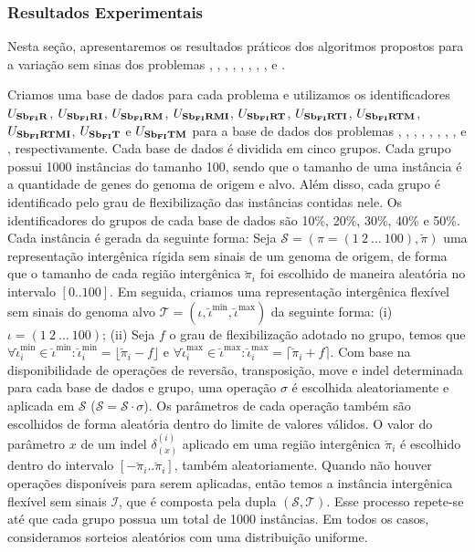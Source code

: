 \subsubsection{Resultados Experimentais}\label{subsubsection:PWLZZAVH}

Nesta seção, apresentaremos os resultados práticos dos algoritmos propostos para a variação sem sinas dos problemas \SbFIR{}, \SbFIRI{}, \SbFIRM{}, \SbFIRMI{}, \SbFIRT{}, \SbFIRTI{}, \SbFIRTM{}, \SbFIRTMI{}, \SbFIT{} e \SbFITM{}.

Criamos uma base de dados para cada problema e utilizamos os identificadores $U_{\textbf{Sb\textsubscript{FI}R}}{}$, $U_{\textbf{Sb\textsubscript{FI}RI}}{}$, $U_{\textbf{Sb\textsubscript{FI}RM}}{}$, $U_{\textbf{Sb\textsubscript{FI}RMI}}{}$, $U_{\textbf{Sb\textsubscript{FI}RT}}{}$, $U_{\textbf{Sb\textsubscript{FI}RTI}}{}$, $U_{\textbf{Sb\textsubscript{FI}RTM}}{}$, $U_{\textbf{Sb\textsubscript{FI}RTMI}}{}$, $U_{\textbf{Sb\textsubscript{FI}T}}{}$ e \break$U_{\textbf{Sb\textsubscript{FI}TM}}{}$ para a base de dados dos problemas \SbFIR{}, \SbFIRI{}, \SbFIRM{}, \SbFIRMI{}, \SbFIRT{}, \SbFIRTI{}, \SbFIRTM{}, \SbFIRTMI{}, \SbFIT{} e \SbFITM{}, respectivamente. Cada base de dados é dividida em cinco grupos. Cada grupo possui 1000 instâncias do tamanho 100, sendo que o tamanho de uma instância é a quantidade de genes do genoma de origem e alvo. Além disso, cada grupo é identificado pelo grau de flexibilização das instâncias contidas nele. Os identificadores do grupos de cada base de dados são 10\%, 20\%, 30\%, 40\% e 50\%. Cada instância é gerada da seguinte forma: Seja $\mathcal{S} = (\pi =(1~2~\dots~100),\breve\pi)$ uma representação intergênica rígida sem sinais de um genoma de origem, de forma que o tamanho de cada região intergênica $\breve\pi_i$ foi escolhido de maneira aleatória no intervalo $[0..100]$. Em seguida, criamos uma representação intergênica flexível sem sinais do genoma alvo $\mathcal{T} = (\iota, \breve\iota^{\min},\breve\iota^{\max})$ da seguinte forma: (i) $\iota =(1~2~\dots~100)$; (ii) Seja $f$ o grau de flexibilização adotado no grupo, temos que $\forall \breve\iota^{\min}_i \in \breve\iota^{\min}: \breve\iota^{\min}_i = \lfloor\breve\pi_i - f\rfloor$ e $\forall \breve\iota^{\max}_i \in \breve\iota^{\max} : \breve\iota^{\max}_i = \lceil\breve\pi_i + f\rceil$. Com base na disponibilidade de operações de reversão, transposição, move e indel determinada para cada base de dados e grupo, uma operação $\sigma$ é escolhida aleatoriamente e aplicada em $\mathcal{S}$ ($\mathcal{S} = \mathcal{S} \cdot \sigma$). Os parâmetros de cada operação também são escolhidos de forma aleatória dentro do limite de valores válidos. O valor do parâmetro $x$ de um indel $\delta^{(i)}_{(x)}$ aplicado em uma região intergênica $\breve\pi_{i}$ é escolhido dentro do intervalo $[-\breve\pi_{i}..\breve\pi_{i}]$, também aleatoriamente. Quando não houver operações disponíveis para serem aplicadas, então temos a instância intergênica flexível sem sinais $\mathcal{I}$, que é composta pela dupla $(\mathcal{S},\mathcal{T})$. Esse processo repete-se até que cada grupo possua um total de 1000 instâncias. Em todos os casos, consideramos sorteios aleatórios com uma distribuição uniforme.

